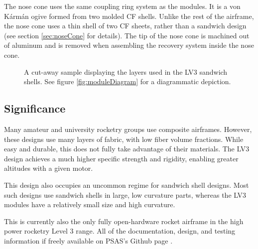 \documentclass{aiaa-tc}%
\begin{document}
The nose cone uses the same coupling ring system as the modules. It is a von K\'arm\'an ogive formed from two molded CF shells. 
Unlike the rest of the airframe, the nose cone uses a thin shell of two CF sheets, rather than a sandwich design (see section \ref{sec:noseCone} for details). 
The tip of the nose cone is machined out of aluminum and is removed when assembling the recovery system inside the nose cone. 

\begin{figure}
\centering
\def\svgwidth{\linewidth}
\parbox{0.45\linewidth}{
	
	\caption{
		Diagram of the male end of a module. 
		The CF (1) is bonded to the honeycomb core (3) and the aluminum coupling ring (4) using structural adhesive (2). 
		The adhesive also serves as a protective coating for the CF and provides a smooth outer surface. 
		See figure \ref{fig:coupon} for a picture of this design.
		}
	\label{fig:moduleDiagram}
}
\hfill
\parbox{0.45\linewidth}{
	
	\caption{
		A cut-away sample displaying the layers used in the LV3 sandwich shells. 
		See figure \ref{fig:moduleDiagram} for a diagrammatic depiction.
		}
	\label{fig:coupon}
}
\end{figure}

\subsection{Significance}
Many amateur and university rocketry groups use composite airframes. However, these designs use many layers of fabric, with low fiber volume fractions.
While easy and durable, this does not fully take advantage of their materials. The LV3 design achieves a much higher specific strength and rigidity, enabling greater altitudes with a given motor. 

This design also occupies an uncommon regime for sandwich shell designs. Most such designs use sandwich shells in large, low curvature parts, whereas the LV3 modules have a relatively small size and high curvature.

This is currently also the only fully open-hardware rocket airframe in the high power rocketry Level 3 range. All of the documentation, design, and testing information if freely available on PSAS's Github page \cite{LV3repo}.
\end{document}

